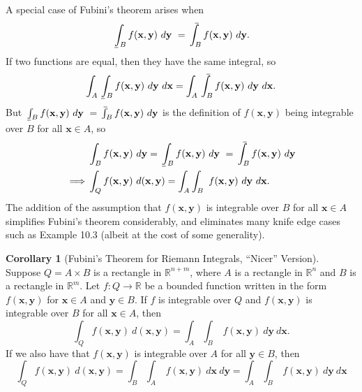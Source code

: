 \documentclass{article}
\def\upint{\mathchoice%
	{\mkern13mu\overline{\vphantom{\intop}\mkern7mu}\mkern-20mu}%
	{\mkern7mu\overline{\vphantom{\intop}\mkern7mu}\mkern-14mu}%
	{\mkern7mu\overline{\vphantom{\intop}\mkern7mu}\mkern-14mu}%
	{\mkern7mu\overline{\vphantom{\intop}\mkern7mu}\mkern-14mu}%
	\int}
\def\lowint{\mkern3mu\underline{\vphantom{\intop}\mkern7mu}\mkern-10mu\int}
\newcommand{\R}{\mathbb{R}}
\newcommand{\x}{\mathbf{x}}
\newcommand{\y}{\mathbf{y}}
\theoremstyle{definition}
\newtheorem{corollary}{Corollary}[section]
\begin{document}
A special case of Fubini's theorem arises when $$ \lowint_Bf(\x,\y)\ d\y\  = \upint_Bf(\x,\y)\ d\y.$$ If two functions are equal, then they have the same integral, so  $$\int_{A}\lowint_Bf(\x,\y)\ d\y\ d\x = \int_{A}\upint_Bf(\x,\y)\ d\y\ d\x.$$ But $  \lowint_Bf(\x,\y)\ d\y\  = \upint_Bf(\x,\y)\ d\y$ is the definition of $ f(\x,\y) $ being integrable over $ B $ for all $ \x\in A $, so 
\begin{align*}
	&\int_Bf(\x,\y)\ d\y = \lowint_Bf(\x,\y)\ d\y\  = \upint_Bf(\x,\y)\ d\y\\
\implies & \int_{Q}f(\x,\y)\ d(\x,\y)= \int_A\int_B \ f(\x,\y)\ d\y \ d\x.
\end{align*}
The addition of the assumption that $ f(\x,\y) $ is integrable over $ B $ for all $ \x\in A $ simplifies Fubini's theorem considerably, and eliminates many knife edge cases such as Example 10.3 (albeit at the cost of some generality). 
 \begin{corollary}[Fubini's Theorem for Riemann Integrals, ``Nicer'' Version]
 	Suppose $ Q= A\times B $ is a rectangle in $ \R^{n+m} $, where $ A $ is a rectangle in $ \R^n $ and $ B $ is a rectangle in $ \R^m $. Let $ f:Q\to\R $ be a bounded function written in the form $ f(\x,\y) $ for $ \x\in A $ and $ \y \in B $. If $ f $ is integrable over $ Q $ and $ f(\x,\y) $ is integrable over $ B $ for all $ \x\in A $, then 
 	$$ \int_{Q}f(\x,\y)\ d(\x,\y)= \int_A\int_B \ f(\x,\y)\ d\y \ d\x.$$
 	If we also have that $ f(\x,\y) $ is integrable over $ A $ for all $ \y\in B $, then 
 	$$ \int_{Q}f(\x,\y)\ d(\x,\y)= \int_B\int_A\ f(\x,\y)\ d\x \ d\y = \int_A\int_B \ f(\x,\y)\ d\y \ d\x$$ 
 \end{corollary}
\end{document}
